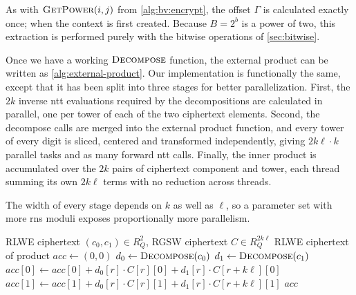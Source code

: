 As with $\Call{GetPower}{i,j}$ from \cref{alg:bv:encrypt}, the offset $\varGamma$ is calculated exactly once; when the context is first created. Because $B=2^b$ is a power of two, this extraction is performed purely with the bitwise operations of \cref{sec:bitwise}.

Once we have a working $\Call{Decompose}{}$ function, the external product can be written as \autoref{alg:external-product}. Our implementation is functionally the same, except that it has been split into three stages for better parallelization. First, the $2k$ inverse \gls{ntt} evaluations required by the decompositions are calculated in parallel, one per tower of each of the two ciphertext elements. Second, the decompose calls are merged into the external product function, and every tower of every digit is sliced, centered and transformed independently, giving $2k\ell\cdot k$ parallel tasks and as many forward \gls{ntt} calls. Finally, the inner product is accumulated over the $2k$ pairs of ciphertext component and tower, each thread summing its own $2k\ell$ terms with no reduction across threads.

The width of every stage depends on $k$ as well as $\ell$, so a parameter set with more \gls{rns} moduli exposes proportionally more parallelism. %

\begin{algorithm}
\caption{External Product}
\label{alg:external-product}
\begin{algorithmic}[1]
\Require RLWE ciphertext $(c_0, c_1) \in R_Q^2$, RGSW ciphertext $C \in R_Q^{2k\ell}$
\Ensure RLWE ciphertext of product
\State $acc \gets (0, 0)$
\State $d_0 \gets \Call{Decompose}{c_0}$
\State $d_1 \gets \Call{Decompose}{c_1}$
\For{$r \gets [0, k\ell)$}
    \State $acc[0] \gets acc[0] + d_0[r] \cdot C[r][0] + d_1[r]\cdot C[r + k\ell][0]$
    \State $acc[1] \gets acc[1] + d_0[r] \cdot C[r][1] + d_1[r]\cdot C[r + k\ell][1]$
\EndFor
\State \Return $acc$
\end{algorithmic}
\end{algorithm}
